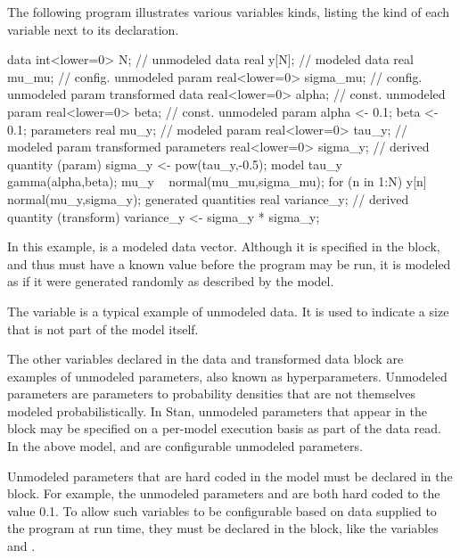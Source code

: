 The following program illustrates various variables kinds, listing the
kind of each variable next to its declaration.
%
\begin{stancode}
data {
  int<lower=0> N;           // unmodeled data
  real y[N];                // modeled data
  real mu_mu;               // config. unmodeled param
  real<lower=0> sigma_mu;   // config. unmodeled param
}
transformed data {
  real<lower=0> alpha;      // const. unmodeled param
  real<lower=0> beta;       // const. unmodeled param
  alpha <- 0.1;
  beta <- 0.1;
}
parameters {
  real mu_y;                // modeled param
  real<lower=0> tau_y;      // modeled param
}
transformed parameters {
  real<lower=0> sigma_y;    // derived quantity (param)
  sigma_y <- pow(tau_y,-0.5);
}
model {
  tau_y ~ gamma(alpha,beta);
  mu_y ~ normal(mu_mu,sigma_mu);
  for (n in 1:N)
    y[n] ~ normal(mu_y,sigma_y);
}
generated quantities {
  real variance_y;       // derived quantity (transform)
  variance_y <- sigma_y * sigma_y;
}
\end{stancode}
%
In this example,  is a modeled data vector.  Although it is
specified in the  block, and thus must have a known value
before the program may be run, it is modeled as if it were generated
randomly as described by the model.

The variable  is a typical example of unmodeled data.  It is
used to indicate a size that is not part of the model itself.

The other variables declared in the data and transformed data block are
examples of unmodeled parameters, also known as hyperparameters.
Unmodeled parameters are parameters to probability densities that are
not themselves modeled probabilistically.  In Stan, unmodeled
parameters that appear in the  block may be specified on a
per-model execution basis as part of the data read.  In the above
model,  and  are configurable unmodeled
parameters.

Unmodeled parameters that are hard coded in the model must be declared
in the  block.  For example, the unmodeled
parameters  and  are both hard coded to the
value 0.1.  To allow such variables to be configurable based on data
supplied to the program at run time, they must be declared in the
 block, like the variables  and
.

